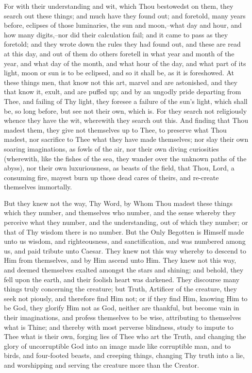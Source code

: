 \documentclass[b5paper,openright,12pt,twoside]{book}
\begin{document}
For with their understanding and wit, which Thou bestowedst on them,
they search out these things; and much have they found out; and
foretold, many years before, eclipses of those luminaries, the sun
and moon,--what day and hour, and how many digits,--nor did their
calculation fail; and it came to pass as they foretold; and they wrote
down the rules they had found out, and these are read at this day, and
out of them do others foretell in what year and month of the year, and
what day of the month, and what hour of the day, and what part of its
light, moon or sun is to be eclipsed, and so it shall be, as it is
foreshowed. At these things men, that know not this art, marvel and are
astonished, and they that know it, exult, and are puffed up; and by
an ungodly pride departing from Thee, and failing of Thy light, they
foresee a failure of the sun's light, which shall be, so long before,
but see not their own, which is. For they search not religiously whence
they have the wit, wherewith they search out this. And finding that Thou
madest them, they give not themselves up to Thee, to preserve what Thou
madest, nor sacrifice to Thee what they have made themselves; nor slay
their own soaring imaginations, as fowls of the air, nor their own
diving curiosities (wherewith, like the fishes of the sea, they wander
over the unknown paths of the abyss), nor their own luxuriousness, as
beasts of the field, that Thou, Lord, a consuming fire, mayest burn up
those dead cares of theirs, and re-create themselves immortally.

But they knew not the way, Thy Word, by Whom Thou madest these things
which they number, and themselves who number, and the sense whereby
they perceive what they number, and the understanding, out of which they
number; or that of Thy wisdom there is no number. But the Only Begotten
is Himself made unto us wisdom, and righteousness, and sanctification,
and was numbered among us, and paid tribute unto Caesar. They knew not
this way whereby to descend to Him from themselves, and by Him ascend
unto Him. They knew not this way, and deemed themselves exalted amongst
the stars and shining; and behold, they fell upon the earth, and their
foolish heart was darkened. They discourse many things truly concerning
the creature; but Truth, Artificer of the creature, they seek not
piously, and therefore find Him not; or if they find Him, knowing Him
to be God, they glorify Him not as God, neither are thankful, but
become vain in their imaginations, and profess themselves to be wise,
attributing to themselves what is Thine; and thereby with most perverse
blindness, study to impute to Thee what is their own, forging lies of
Thee who art the Truth, and changing the glory of uncorruptible God
into an image made like corruptible man, and to birds, and four-footed
beasts, and creeping things, changing Thy truth into a lie, and
worshipping and serving the creature more than the Creator.
\end{document}
